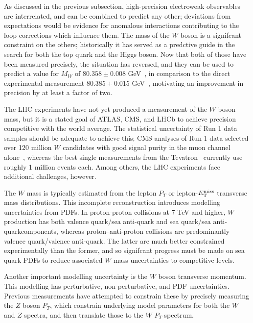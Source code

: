
As discussed in the previous subsection, high-precision electroweak
observables are interrelated, and can be combined to predict any
other; deviations from expectations would be evidence for anomalous
interactions contributing to the loop corrections which influence
them.  The mass of the $W$ boson is a signifcant constraint on the
others; historically it has served as a predctive guide in the search for
both the top quark and the Higgs boson.  Now that both of those have been
measured precisely, the situation has reversed, and they can be used
to predict a value for $M_W$ of $80.358 \pm 0.008$
GeV~\cite{Baak:2014ora}, in comparison to the direct experimental
measurement $80.385 \pm 0.015$ GeV~\cite{Aaltonen:2013iut}, motivating
an improvement in precision by at least a factor of two.

The LHC experiments have not yet produced a measurement of the $W$
boson mass, but it is a stated goal of ATLAS, CMS, and LHCb to achieve
precision competitive with the world average.  The statistical
uncertainty of Run 1 data samples should be adequate to achieve this;
CMS analyses of Run 1 data selected over 120 million $W$ candidates
with good signal purity in the muon channel
alone~\cite{Chatrchyan:2013mza,Khachatryan:2016pev}, whereas the best
single measurements from the
Tevatron~\cite{Aaltonen:2012bp,Abazov:2012bv} currently use roughly 1
million events each.  Among others, the LHC experiments face
additional challenges, however.

The $W$ mass is typically estimated from the lepton $P_T$ or
lepton-$E_{\mathrm{T}}^{\mathrm{miss}}$ transverse mass distributions.  This incomplete
reconstruction introduces modelling uncertainties from PDFs. In
proton-proton collisions at 7 TeV and higher, $W$ production has both
valence quark/sea anti-quark and sea quark/sea anti-quarkcomponents,
whereas proton--anti-proton collisions are predominantly valence
quark/valence anti-quark.  The latter are much better constrained
experimentally than the former, and so signifcant progress must be
made on sea quark PDFs to reduce associated $W$ mass uncertainties to
competitive levels.

Another important modelling uncertainty is the $W$ boson transverse
momentum.  This modelling has perturbative, non-perturbative, and PDF
uncertainties. Previous measurements have attempted to constrain these
by precisely measuring the $Z$ boson $P_T$, which constrain underlying
model parameters for both the $W$ and $Z$ spectra, and then translate
those to the $W$ $P_T$ spectrum. 

